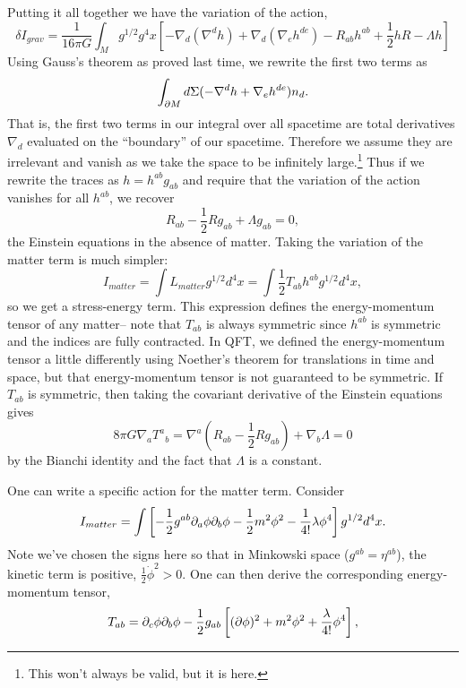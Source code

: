 Putting it all together we have the variation of the action,
$$
\delta I_{grav}=\frac{1}{16\pi G} \int_M g^{1/2} g^4 x \left[-\nabla_d (\nabla^d h) +\nabla_d (\nabla_e h^{de}) - R_{ab} h^{ab} +\frac{1}{2} h R - \Lambda h\right]$$
Using Gauss's theorem as proved last time, we rewrite the first two terms as
$$\int_{\partial M}d \Sigma (-\nabla^d h + \nabla_e h^{de})n_d.$$
That is, the first two terms in our integral over all spacetime are total derivatives $\nabla_d$ evaluated on the ``boundary'' of our spacetime. Therefore we assume they are irrelevant and vanish as we take the space to be infinitely large.\footnote{This won't always be valid, but it is here.} Thus if we rewrite the traces as $h=h^{ab}g_{ab}$ and require that the variation of the action vanishes for all $h^{ab}$, we recover
$$R_{ab}-\frac{1}{2}R g_{ab}+\Lambda g_{ab}=0,$$
the Einstein equations in the absence of matter. Taking the variation of the matter term is much simpler:
$$I_{matter}=\int L_{matter} g^{1/2}d^4x = \int \frac{1}{2} T_{ab} h^{ab} g^{1/2} d^4x,$$
so we get a stress-energy term. This expression defines the energy-momentum tensor of any matter-- note that $T_{ab}$ is always symmetric since $h^{ab}$ is symmetric and the indices are fully contracted. In QFT, we defined the energy-momentum tensor a little differently using Noether's theorem for translations in time and space, but that energy-momentum tensor is not guaranteed to be symmetric. If $T_{ab}$ is symmetric, then taking the covariant derivative of the Einstein equations gives
$$8\pi G \nabla_a T^a{}_b= \nabla^a(R_{ab}-\frac{1}{2} R g_{ab})+\nabla_b \Lambda = 0$$
by the Bianchi identity and the fact that $\Lambda$ is a constant.

\begin{exm}
One can write a specific action for the matter term. Consider
$$I_{matter}=\int \left[-\frac{1}{2} g^{ab}\partial_a \phi \partial_b \phi-\frac{1}{2} m^2 \phi^2 -\frac{1}{4!} \lambda \phi^4 \right] g^{1/2} d^4x.$$
Note we've chosen the signs here so that in Minkowski space ($g^{ab}=\eta^{ab}$), the kinetic term is positive, $\frac{1}{2} \dot \phi^2 >0.$ One can then derive the corresponding energy-momentum tensor,
$$T_{ab}=\partial_c \phi \partial_b \phi -\frac{1}{2} g_{ab} \left[(\partial\phi)^2+m^2\phi^2+\frac{\lambda}{4!}\phi^4\right],$$
\end{exm}